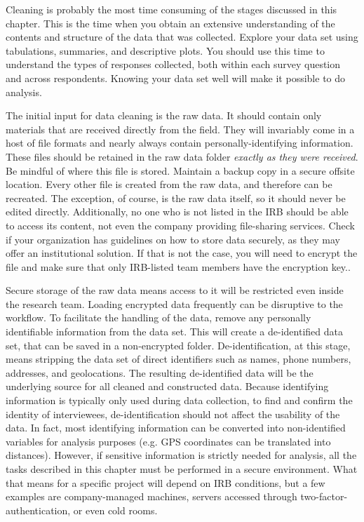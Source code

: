 Cleaning is probably the most time consuming of the stages discussed in this chapter.
This is the time when you obtain an extensive understanding of  the contents and structure of the data that was collected.
Explore your data set using tabulations, summaries, and descriptive plots.
You should use this time to understand the types of responses collected, both within each survey question and across respondents.
Knowing your data set well will make it possible to do analysis.


The initial input for data cleaning is the raw data.
It should contain only materials that are received directly from the field.
They will invariably come in a host of file formats and nearly always contain personally-identifying information.
These files should be retained in the raw data folder \textit{exactly as they were received}.
Be mindful of where this file is stored. 
Maintain a backup copy in a secure offsite location.
Every other file is created from the raw data, and therefore can be recreated.
The exception, of course, is the raw data itself, so it should never be edited directly.
Additionally, no one who is not listed in the IRB should be able to access its content, not even the company providing file-sharing services. Check if your organization has guidelines on how to store data securely, as they may offer an institutional solution. If that is not the case, you will need to encrypt the file and make sure that only IRB-listed team members have the encryption key..

Secure storage of the raw data means access to it will be restricted even inside the research team.
Loading encrypted data frequently can be disruptive to the workflow.
To facilitate the handling of the data, remove any personally identifiable information from the data set.
This will create a de-identified data set, that can be saved in a non-encrypted folder. 
De-identification,
at this stage, means stripping the data set of direct identifiers such as names, phone numbers, addresses, and geolocations.
The resulting de-identified data will be the underlying source for all cleaned and constructed data.
Because identifying information is typically only used during data collection, 
to find and confirm the identity of interviewees, 
de-identification should not affect the usability of the data.
In fact, most identifying information can be converted into non-identified variables for analysis purposes
(e.g. GPS coordinates can be translated into distances). 
However, if sensitive information is strictly needed for analysis,
all the tasks described in this chapter must be performed in a secure environment.
What that means for a specific project will depend on IRB conditions,
but a few examples are company-managed machines, 
servers accessed through two-factor-authentication,
or even cold rooms.

